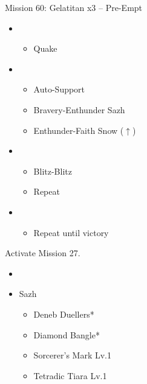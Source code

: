 \begin{battle}{Mission 60: Gelatitan x3 -- Pre-Empt}
	\begin{itemize}
		\item \first
			\begin{itemize}
				\item Quake
			\end{itemize}
		\item \fourth
			\begin{itemize}
				\item Auto-Support
				\item Bravery-Enthunder Sazh
				\item Enthunder-Faith Snow ($\uparrow$)
			\end{itemize}
		\item \sixth
			\begin{itemize}
				\item Blitz-Blitz
				\item Repeat
			\end{itemize}
		\item \second
			\begin{itemize}
				\item Repeat until victory
			\end{itemize}
	\end{itemize}
\end{battle}

Activate Mission 27.

\begin{menu}
	\begin{itemize}
	\paradigm
		\begin{itemize}
			\item {}%
				{\paradigmline{\rav}{\rav}{(\rav)}}%
				{\paradigmline{\com}{\com}{\com}}%
				{\paradigmline[4]{\com}{\sen}{\med}}%
				{\paradigmline{\syn}{\sen}{(\rav)}}%
				{\paradigmline{\rav}{\rav}{\med}}%
				{\paradigmline{\com}{\com}{\med}}%
		\end{itemize}
	\equip
		\begin{itemize}
			\item Sazh
				\begin{itemize}
					\item Deneb Duellers*
					\item Diamond Bangle*
					\item Sorcerer's Mark Lv.1
					\item Tetradic Tiara Lv.1
				\end{itemize}
		\end{itemize}
	\end{itemize}
\end{menu}

